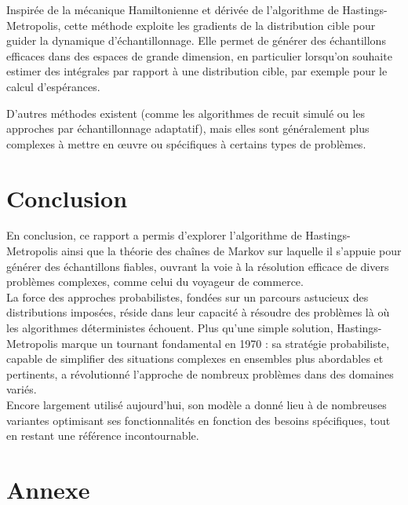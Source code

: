 \documentclass{article}
\begin{document}
\begin{tcolorbox}[colback=white,colframe=yellow!80!black,title=Le Monte Carlo Hamiltonien (HMC)]
Inspirée de la mécanique Hamiltonienne et dérivée de l'algorithme de Hastings-Metropolis, cette méthode exploite les gradients de la distribution cible pour guider la dynamique d'échantillonnage. Elle permet de générer des échantillons efficaces dans des espaces de grande dimension, en particulier lorsqu'on souhaite estimer des intégrales par rapport à une distribution cible, par exemple pour le calcul d'espérances.
\end{tcolorbox}

D'autres méthodes existent (comme les algorithmes de recuit simulé ou les approches par échantillonnage adaptatif), 
mais elles sont généralement plus complexes à mettre en œuvre ou spécifiques à certains types de problèmes.

\newpage %
\section{Conclusion}

En conclusion, ce rapport a permis d'explorer l'algorithme de Hastings-Metropolis ainsi que la théorie des chaînes de Markov sur laquelle il s'appuie pour générer des échantillons fiables, ouvrant la voie à la résolution efficace de divers problèmes complexes, comme celui du voyageur de commerce. \\

La force des approches probabilistes, fondées sur un parcours astucieux des distributions imposées, réside dans leur capacité à résoudre des problèmes là où les algorithmes déterministes échouent.
Plus qu'une simple solution, Hastings-Metropolis marque un tournant fondamental en 1970 : sa stratégie probabiliste, capable de simplifier des situations complexes en ensembles plus abordables et pertinents, a révolutionné l'approche de nombreux problèmes dans des domaines variés. \\

Encore largement utilisé aujourd'hui, son modèle a donné lieu à de nombreuses variantes optimisant ses fonctionnalités en fonction des besoins spécifiques, tout en restant une référence incontournable. \\

\newpage
\section{Annexe}
\end{document}
